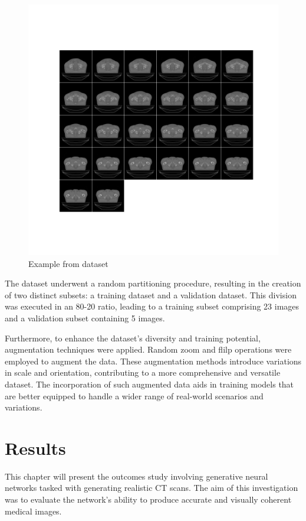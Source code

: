 \documentclass[11pt,a4paper]{report}
\begin{document}
\begin{figure}[H]
	\centering
	\includegraphics[scale=0.55]{images/datasetExample}
    \caption{Example from dataset}
\end{figure}
The dataset underwent a random partitioning procedure, resulting in the creation of two distinct subsets: a training dataset and a validation dataset. This division was executed in an 80-20 ratio, leading to a training subset comprising 23 images and a validation subset containing 5 images.

Furthermore, to enhance the dataset's diversity and training potential, augmentation techniques were applied. Random zoom and flilp operations were employed to augment the data. These augmentation methods introduce variations in scale and orientation, contributing to a more comprehensive and versatile dataset. The incorporation of such augmented data aids in training models that are better equipped to handle a wider range of real-world scenarios and variations.


\chapter{Results}
This chapter will present the outcomes study involving generative neural networks tasked with generating realistic CT scans. The aim of this investigation was to evaluate the network's ability to produce accurate and visually coherent medical images.
\end{document}

